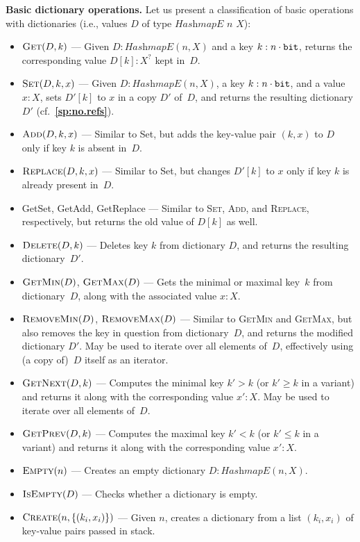 \documentclass[12pt,oneside]{article}
\def\makepoint#1{\medbreak\noindent{\bf #1.\ }}
\def\nxsubpoint{\refstepcounter{subsubsection}%
  \smallbreak\makepoint{\thesubsubsection}}
\def\refpoint#1{{\rm\textbf{\ref{#1}}}}
\let\ptref=\refpoint
\def\emb#1{\textbf{#1.}}
\let\tp=\textit
\def\HashmapE{\tp{HashmapE}}
\begin{document}
\nxsubpoint\label{sp:dict.ops}\emb{Basic dictionary operations}
Let us present a classification of basic operations with dictionaries (i.e., values $D$ of type $\HashmapE$ $n$ $X$):
\begin{itemize}
\item $\textsc{Get}(D,k)$ --- Given $D:\HashmapE(n,X)$ and a key $k:n\cdot{\tt bit}$, returns the corresponding value $D[k]:X^?$ kept in~$D$.
\item $\textsc{Set}(D,k,x)$ --- Given $D:\HashmapE(n,X)$, a key $k:n\cdot{\tt bit}$, and a value $x:X$, sets $D'[k]$ to $x$ in a copy $D'$ of~$D$, and returns the resulting dictionary $D'$ (cf.~\ptref{sp:no.refs}).
\item $\textsc{Add}(D,k,x)$ --- Similar to {\sc Set}, but adds the key-value pair $(k,x)$ to $D$ only if key $k$ is absent in~$D$.
\item $\textsc{Replace}(D,k,x)$ --- Similar to {\sc Set}, but changes $D'[k]$ to $x$ only if key $k$ is already present in~$D$.
\item {\sc GetSet}, {\sc GetAdd}, {\sc GetReplace} --- Similar to \textsc{Set}, \textsc{Add}, and \textsc{Replace}, respectively, but returns the old value of $D[k]$ as well.
\item $\textsc{Delete}(D,k)$ --- Deletes key $k$ from dictionary $D$, and returns the resulting dictionary~$D'$.
\item $\textsc{GetMin}(D)$, $\textsc{GetMax}(D)$ --- Gets the minimal or maximal key~$k$ from dictionary~$D$, along with the associated value $x:X$.
\item $\textsc{RemoveMin}(D)$, $\textsc{RemoveMax}(D)$ --- Similar to \textsc{GetMin} and \textsc{GetMax}, but also removes the key in question from dictionary~$D$, and returns the modified dictionary $D'$. May be used to iterate over all elements of~$D$, effectively using (a copy of)~$D$ itself as an iterator.
\item $\textsc{GetNext}(D,k)$ --- Computes the minimal key $k'>k$ (or $k'\geq k$ in a variant) and returns it along with the corresponding value $x':X$. May be used to iterate over all elements of~$D$.
\item $\textsc{GetPrev}(D,k)$ --- Computes the maximal key $k'<k$ (or $k'\leq k$ in a variant) and returns it along with the corresponding value $x':X$.
\item $\textsc{Empty}(n)$ --- Creates an empty dictionary $D:\HashmapE(n,X)$.
\item $\textsc{IsEmpty}(D)$ --- Checks whether a dictionary is empty.
\item $\textsc{Create}(n,\{(k_i,x_i)\})$ --- Given $n$, creates a dictionary from a list ${(k_i,x_i)}$ of key-value pairs passed in stack.

\end{itemize}
\end{document}
